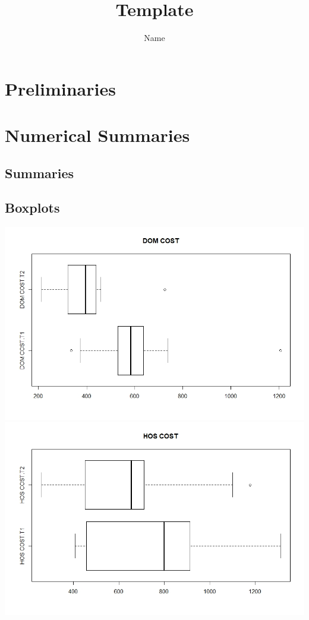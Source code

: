 \documentclass[11pt]{article}
\title{Template}
\author{Name}
\begin{document}
\maketitle
\section{Preliminaries}
\section{Numerical Summaries}
\subsection{Summaries}

\subsection{Boxplots}
\includegraphics[width=15cm]{RStudio/jpeg/Box DOM.jpeg}
\includegraphics[width=15cm]{RStudio/jpeg/Box HOS.jpeg}
\end{document}
